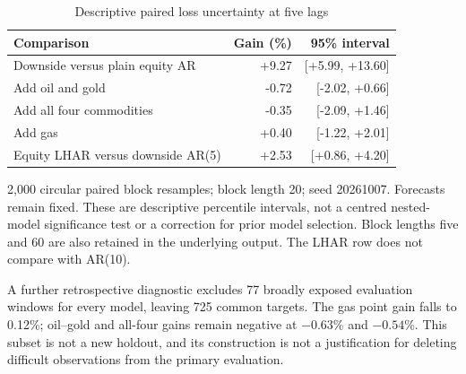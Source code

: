 \documentclass[11pt,letterpaper]{article}
\begin{document}
\begin{table}[H]
\centering
\caption{Descriptive paired loss uncertainty at five lags}\label{tab:intervals}
\footnotesize
\begin{tabular}{p{3.6in}rr}
\toprule
Comparison & Gain (\%) & 95\% interval \\
\midrule
Downside versus plain equity AR & +9.27 & [+5.99, +13.60] \\
Add oil and gold & -0.72 & [-2.02, +0.66] \\
Add all four commodities & -0.35 & [-2.09, +1.46] \\
Add gas & +0.40 & [-1.22, +2.01] \\
Equity LHAR versus downside AR(5) & +2.53 & [+0.86, +4.20] \\
\bottomrule
\end{tabular}
\end{table}
{\footnotesize 2,000 circular paired block resamples; block length 20; seed 20261007. Forecasts remain fixed. These are descriptive percentile intervals, not a centred nested-model significance test or a correction for prior model selection. Block lengths five and 60 are also retained in the underlying output. The LHAR row does not compare with AR(10).\par}


A further retrospective diagnostic excludes 77 broadly exposed evaluation windows
for every model, leaving 725 common targets. The gas point gain falls to 0.12\%;
oil--gold and all-four gains remain negative at $-0.63$\% and $-0.54$\%.
This subset is not a new holdout, and its construction is not a justification for
deleting difficult observations from the primary evaluation.
\end{document}
